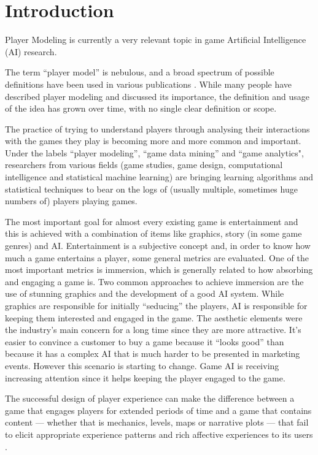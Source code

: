 \chapter{Introduction}

Player Modeling is currently a very relevant topic in game Artificial Intelligence (AI) research.

The term “player model” is nebulous, and a broad spectrum of possible definitions have been used in various publications \citep{SmithInclusiveTaxonomyPlayer}. While many people have described player modeling and discussed its importance, the definition and usage of the idea has grown over time, with no single clear definition or scope.

The practice of trying to understand players through analysing their interactions with the games they play is becoming more and more common and important. Under the labels “player modeling”, “game data mining” and “game analytics", researchers from various fields (game studies, game design, computational intelligence and statistical machine learning) are bringing learning algorithms and statistical techniques to bear on the logs of (usually multiple, sometimes huge numbers of) players playing games.

The most important goal for almost every existing game is entertainment \citep{NareyekAIComputerGames2004} and this is achieved with a combination of items like graphics, story (in some game genres) and AI.
Entertainment is a subjective concept and, in order to know how much a game entertains a player, some general metrics are evaluated. One of the most important metrics is immersion, which is generally related to how absorbing and engaging a game is. Two common approaches to achieve immersion are the use of stunning graphics and the development of a good AI system. While graphics are responsible for initially “seducing” the players, AI is responsible for keeping them interested and engaged in the game.
The aesthetic elements were the industry’s main concern for a long time since they are more attractive. It's easier to convince a customer to buy a game because it “looks good” than because it has a complex AI that is much harder to be presented in marketing events. However this scenario is starting to change. Game AI is receiving increasing attention since it helps keeping the player engaged to the game.

The successful design of player experience can make the difference between a game that engages players for extended periods of time and a game that contains content — whether that is mechanics, levels, maps or narrative plots — that fail to elicit appropriate experience patterns and rich affective experiences to its users \citep{YannakakisEmotionGames2011}.

